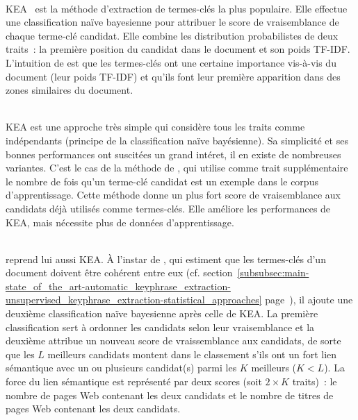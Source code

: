         ~\\KEA~\cite{witten1999kea} est la méthode d'extraction de termes-clés
        la plus populaire. Elle effectue une classification naïve bayesienne
        pour attribuer le score de vraisemblance de chaque terme-clé candidat.
        Elle combine les distribution probabilistes de deux traits~: la première
        position du candidat dans le document et son poids TF-IDF. L'intuition
        de  est que les termes-clés ont une certaine
        importance vis-à-vis du document (leur poids TF-IDF) et qu'ils font leur
        première apparition dans des zones similaires du document.

        ~\\KEA est une approche très simple qui considère tous les traits comme
        indépendants (principe de la classification naïve bayésienne). Sa
        simplicité et ses bonnes performances ont suscitées un grand intéret, il
        en existe de nombreuses variantes. C'est le cas de la méthode de
        , qui utilise comme trait supplémentaire
        le nombre de fois qu'un terme-clé candidat est un exemple dans le corpus
        d'apprentissage. Cette méthode donne un plus fort score de vraisemblance
        aux candidats déjà utilisés comme termes-clés. Elle améliore les
        performances de KEA, mais nécessite plus de données d'apprentissage.
        
        ~\\ reprend lui aussi KEA. À l'instar de
        , qui estiment que les
        termes-clés d'un document doivent être cohérent entre eux (cf.
        section~\ref{subsubsec:main-state_of_the_art-automatic_keyphrase_extraction-unsupervised_keyphrase_extraction-statistical_approaches}
        page~\pageref{subsubsec:main-state_of_the_art-automatic_keyphrase_extraction-unsupervised_keyphrase_extraction-statistical_approaches:ilp}),
        il ajoute une deuxième classification naïve bayesienne après celle de
        KEA. La première classification sert à ordonner les candidats selon leur
        vraisemblance et la deuxième attribue un nouveau score de vraissemblance
        aux candidats, de sorte que les $L$ meilleurs candidats montent dans le
        classement s'ils ont un fort lien sémantique avec un ou plusieurs
        candidat(s) parmi les $K$ meilleurs ($K < L$). La force du lien
        sémantique est représenté par deux scores (soit $2 \times K$ traits)~:
        le nombre de pages Web contenant les deux candidats et le nombre de
        titres de pages Web contenant les deux candidats.


